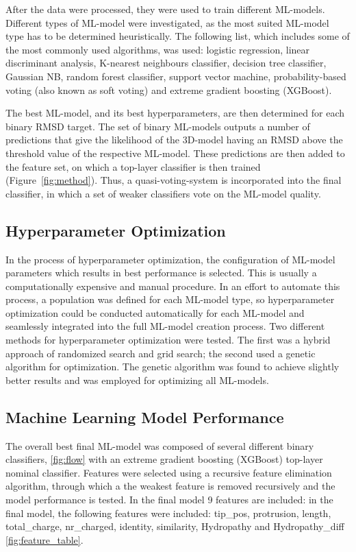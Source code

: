 \documentclass[12pt]{article}
\begin{document}
After the data were processed, they were used to train different
ML-models. Different types of ML-model were investigated, as the most
suited ML-model type has to be determined heuristically. 
The following list, which includes some of the most commonly used
algorithms, was used: logistic regression, linear discriminant analysis,
K-nearest neighbours classifier, decision tree classifier, Gaussian
NB, random forest classifier, support vector machine,
probability-based voting (also known as soft voting) and extreme
gradient boosting (XGBoost)\cite{Chen2016}.

The best ML-model, and its best hyperparameters, are then determined for
each binary RMSD target. The set of binary ML-models outputs a number of
predictions that give the likelihood of the 3D-model having an RMSD above
the threshold value of the respective ML-model. These predictions are
then added to the feature set, on which a top-layer classifier is then
trained (Figure~\ref{fig:method}). Thus, a quasi-voting-system is incorporated into the final
classifier, in which a set of weaker classifiers vote on the ML-model
quality.

\subsection{Hyperparameter Optimization}
In the process of hyperparameter optimization, the configuration of
ML-model parameters which results in best performance is selected. This
is usually a computationally expensive and manual procedure.
In an effort to automate this process, a population was defined for
each ML-model type, so hyperparameter optimization could be conducted
automatically for each ML-model and seamlessly integrated into the full
ML-model creation process. Two different methods for hyperparameter
optimization were tested. The first was a hybrid approach of randomized
search and grid search; the second used a genetic algorithm for
optimization. The genetic algorithm was found to achieve slightly
better results and was employed for optimizing all ML-models.

\subsection{Machine Learning Model Performance}
The overall best final ML-model was composed of several different binary
classifiers, \ref{fig:flow} with an extreme gradient boosting (XGBoost) top-layer
nominal classifier. Features were selected using a recursive feature elimination algorithm, through which a the weakest feature is removed recursively and the model performance is tested. In the final model 9 features are included: in the final model, the following features were included: tip\_pos, protrusion, length, total\_charge, nr\_charged, identity, similarity, Hydropathy and Hydropathy\_diff \ref{fig:feature_table}.
\end{document}
